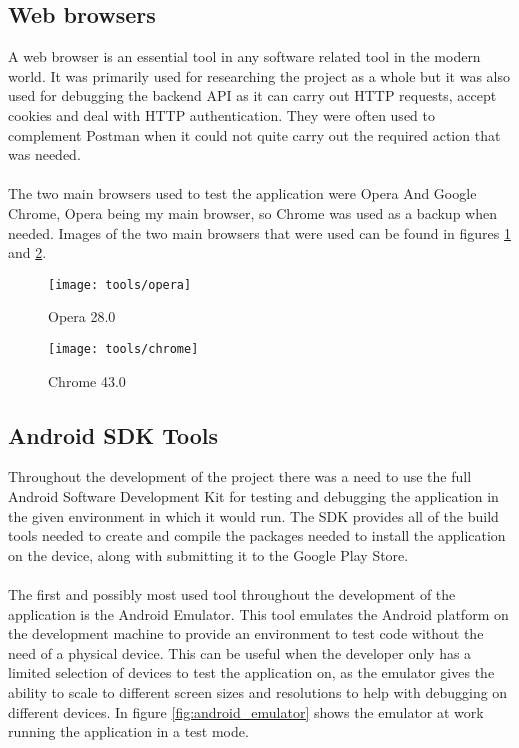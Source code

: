 \subsection*{Web browsers}

A web browser is an essential tool in any software related tool in the modern world. It was primarily used for researching the project as a whole but it was also used for debugging the backend API as it can carry out HTTP requests, accept cookies and deal with HTTP authentication. They were often used to complement Postman when it could not quite carry out the required action that was needed.\\
\\
The two main browsers used to test the application were Opera And Google Chrome, Opera being my main browser, so Chrome was used as a backup when needed. Images of the two main browsers that were used can be found in figures \ref{fig:opera_image} and \ref{fig:chrome_image}.

\begin{figure}[H]
    \centering
    \texttt{[image: tools/opera]}
    \caption{Opera 28.0}
    \label{fig:opera_image}
\end{figure} 

\begin{figure}[H]
    \centering
    \texttt{[image: tools/chrome]}
    \caption{Chrome 43.0}
    \label{fig:chrome_image}
\end{figure} 

\subsection*{Android SDK Tools}

Throughout the development of the project there was a need to use the full Android Software Development Kit for testing and debugging the application in the given environment in which it would run. The SDK provides all of the build tools needed to create and compile the packages needed to install the application on the device, along with submitting it to the Google Play Store.\\
\\
The first and possibly most used tool throughout the development of the application is the Android Emulator. This tool emulates the Android platform on the development machine to provide an environment to test code without the need of a physical device. This can be useful when the developer only has a limited selection of devices to test the application on, as the emulator gives the ability to scale to different screen sizes and resolutions to help with debugging on different devices. In figure \ref{fig:android_emulator} shows the emulator at work running the application in a test mode.

